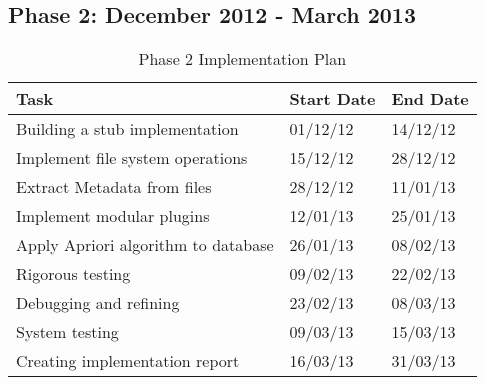 \subsection*{Phase 2: December 2012 - March 2013} 
\begin{table}[h]
\begin{tabular}{|p{7cm}|p{2cm}|p{2cm}|}
\hline
\textbf {Task} & \textbf {Start Date} & \textbf{End Date} \\ \hline
Building a stub implementation & 01/12/12 & 14/12/12 \\ \hline
Implement file system operations & 15/12/12 & 28/12/12  \\ \hline
Extract Metadata from files & 28/12/12 & 11/01/13 \\ \hline
Implement modular plugins & 12/01/13 & 25/01/13 \\ \hline
Apply Apriori algorithm to database & 26/01/13 & 08/02/13 \\ \hline
Rigorous testing & 09/02/13 & 22/02/13  \\ \hline
Debugging and refining & 23/02/13 & 08/03/13 \\ \hline
System testing & 09/03/13 & 15/03/13  \\ \hline
Creating implementation report & 16/03/13 & 31/03/13 \\
\hline
\end{tabular}
\caption{Phase 2 Implementation Plan}
\label{tab:P2plan}
\end{table}
